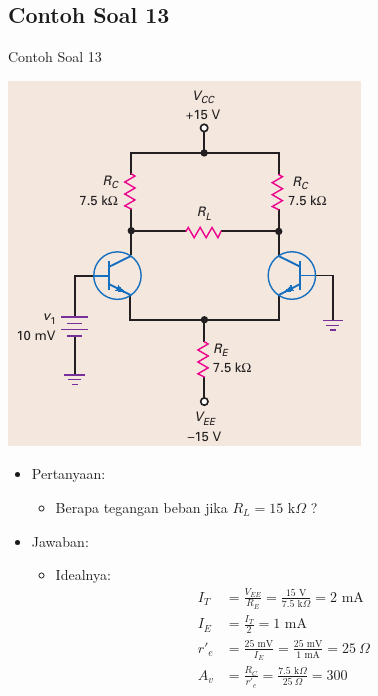 \documentclass[aspectratio=169]{beamer}
\begin{document}
\subsection{Contoh Soal 13}
\begin{frame}{Contoh Soal 13}
	\begin{multicols}{2}
		\begin{center}
			\includegraphics[height=0.7\textheight]{gambar/01.fig32}
		\end{center}
		\columnbreak
		\begin{itemize}
			\item Pertanyaan:
			\begin{itemize}
				\item Berapa tegangan beban jika $ R_L = 15 \text{ k}\Omega $ ?
			\end{itemize}
			\item Jawaban:
			\begin{itemize}
				\item Idealnya:
				\begin{align*}
					I_T &= \frac{V_{EE}}{R_E} = \frac{15 \text{ V}}{7.5 \text{ k}\Omega} = 2 \text{ mA} \\
					I_E &= \frac{I_T}{2} = 1 \text{ mA} \\
					r'_e &= \frac{25 \text{ mV}}{I_E} = \frac{25 \text{ mV}}{1 \text{ mA}} = 25~\Omega \\
					A_v &= \frac{R_C}{r'_e} = \frac{7.5 \text{ k}\Omega}{25~\Omega} = 300
				\end{align*}
			\end{itemize}
		\end{itemize}
	\end{multicols}
\end{frame}
\end{document}
